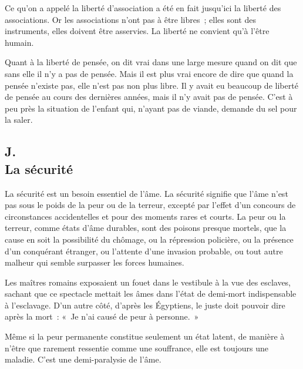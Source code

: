 \documentclass[french,twoside]{book} %
\begin{document}
Ce qu'on a appelé la liberté d'association a été en fait jusqu'ici la liberté des associations. Or les associations n'ont pas à être libres ; elles sont des instruments, elles doivent être asservies. La liberté ne convient qu'à l'être humain.\par
Quant à la liberté de pensée, on dit vrai dans une large mesure quand on dit que sans elle il n'y a pas de pensée. Mais il est plus vrai encore de dire que quand la pensée n'existe pas, elle n'est pas non plus libre. Il y avait eu beaucoup de liberté de pensée au cours des dernières années, mais il n'y avait pas de pensée. C'est à peu près la situation de l'enfant qui, n'ayant pas de viande, demande du sel pour la saler.
\subsection[J. La sécurité]{J. \\
La sécurité}
\noindent \par
La sécurité est un besoin essentiel de l'âme. La sécurité signifie que l'âme n'est pas sous le poids de la peur ou de la terreur, excepté par l'effet d'un concours de circonstances accidentelles et pour des moments rares et courts. La peur ou la terreur, comme états d'âme durables, sont des poisons presque mortels, que la cause en soit la possibilité du chômage, ou la répression policière, ou la présence d'un conquérant étranger, ou l'attente d'une invasion probable, ou tout autre malheur qui semble surpasser les forces humaines.\par
Les maîtres romains exposaient un fouet dans le vestibule à la vue des esclaves, sachant que ce spectacle mettait les âmes dans l'état de demi-mort indispensable à l'esclavage. D'un autre côté, d'après les Égyptiens, le juste doit pouvoir dire après la mort : « Je n'ai causé de peur à personne. »\par
Même si la peur permanente constitue seulement un état latent, de manière à n'être que rarement ressentie comme une souffrance, elle est toujours une maladie. C'est une demi-paralysie de l'âme.
\end{document}
